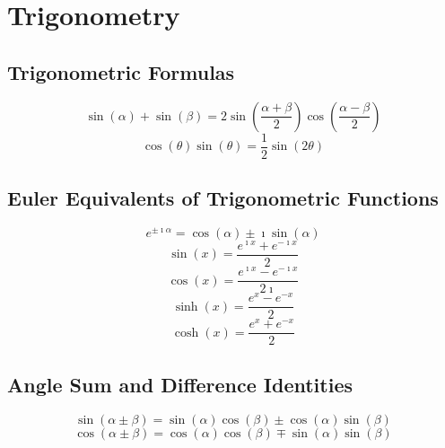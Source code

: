 \section{Trigonometry} \label{app:Trig}
	\subsection{Trigonometric Formulas} \label{subsec:Trig Formulas}
		\begin{equation} \label{eq:Sin plus Sin with diff Angles}
			\sin \left( \alpha \right) + \sin \left( \beta \right) = 2 \sin \left( \frac{\alpha + \beta}{2} \right) \cos\left( \frac{\alpha - \beta}{2} \right)  
		\end{equation}
		\begin{equation} \label{eq:Cosine-Sine Product}
			\cos \left( \theta \right) \sin \left( \theta \right) = \frac{1}{2} \sin \left( 2 \theta \right)
		\end{equation}
	
	\subsection{Euler Equivalents of Trigonometric Functions} \label{subsec:Euler Equivalents}
		\begin{equation} \label{eq:Euler Complex}
			e^{\pm \imath \alpha} = \cos \left( \alpha \right) \pm \imath \sin \left( \alpha \right)
		\end{equation}
		\begin{equation} \label{eq:Euler Sin}
			\sin \left( x \right) = \frac{e^{\imath x} + e^{-\imath x}}{2}
		\end{equation}
		\begin{equation} \label{eq:Euler Cos}
			\cos \left( x \right) = \frac{e^{\imath x} - e^{-\imath x}}{2 \imath}
		\end{equation}
		\begin{equation} \label{eq:Euler Sinh}
			\sinh \left( x \right) = \frac{e^{x} - e^{-x}}{2}
		\end{equation}
		\begin{equation} \label{eq:Euler Cosh}
			\cosh \left( x \right) = \frac{e^{x} + e^{-x}}{2}
		\end{equation}
	
	\subsection{Angle Sum and Difference Identities} \label{subsec:Angle Sum and Difference Identities}
		\begin{equation} \label{eq:Sin Angle Sum and Difference}
			\sin \left( \alpha \pm \beta \right) = \sin \left( \alpha \right) \cos \left( \beta \right) \pm \cos \left( \alpha \right) \sin \left( \beta \right)
		\end{equation}
		\begin{equation} \label{eq:Cos Angle Sum and Difference}
			\cos \left( \alpha \pm \beta \right) = \cos \left( \alpha \right) \cos \left( \beta \right) \mp \sin \left( \alpha \right) \sin \left( \beta \right)
		\end{equation}
	
